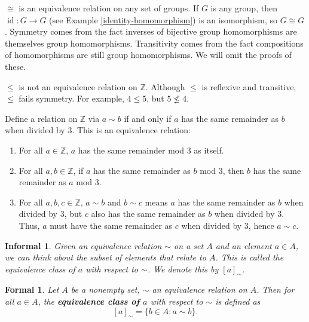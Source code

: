 \documentclass{amsart}
\DeclareMathOperator{\id}{id}
\newtheorem*{formal}{Formal}
\newtheorem*{informal}{Informal}
\begin{document}
\begin{example}\label{isomorphism}
   \(\cong\) is an equivalence relation on any set of groups. If \(G\) is any
	group, then \(\id: G\to G\) (see Example \ref{identity-homomorphism}) is an
	isomorphism, so \(G\cong G\). Symmetry comes from the fact
	inverses of bijective group homomorphisms are themselves group
	homomorphisms. Transitivity comes from the fact compositions of
	homomorphisms are still group homomorphisms. We will omit the proofs of
	these.
\end{example}

\begin{example}
   \(\le\) is not an equivalence relation on \(\mathbb{Z}\). Although \(\le\)
	is reflexive and transitive, \(\le\) fails symmetry. For example, \(4\le
	5\), but \(5\not\le 4\).
\end{example}

\begin{example}\label{mod3rel}
  Define a relation on \(\mathbb{Z}\) via \(a\sim b\) if and only if \(a\) has
  the same remainder as \(b\) when divided by \(3\). This is an equivalence
  relation:
  \begin{enumerate}[label=(\roman*)]
	  \item For all \(a\in\mathbb{Z}\), \(a\) has the same remainder mod 3 as
	  itself.
	  \item For all \(a, b\in\mathbb{Z}\), if \(a\) has the same remainder as
	  \(b\) mod \(3\), then \(b\) has the same remainder as \(a\) mod \(3\).
	  \item For all \(a, b, c\in\mathbb{Z}\), \(a\sim b\) and \(b\sim c\)
	  means \(a\) has the same remainder as \(b\) when divided by \(3\), but
	  \(c\) also has the same remainder as \(b\) when divided by \(3\). Thus,
		\(a\) must have the same remainder as \(c\) when divided by \(3\), hence
	  \(a\sim c\).
  \end{enumerate}
\end{example}

\begin{definition}[{\cite[p.~3]{df}}]
   \begin{informal}
		Given an equivalence relation \(\sim\) on a set \(A\) and an element
		\(a\in A\),
		we can think about the subset of elements that relate to \(A\). This is
		called the \emph{equivalence class} of \(a\) with respect to \(\sim\). We
		denote this by \([a]_{\sim}\).
	\end{informal}
	\begin{formal}
		Let \(A\) be a nonempty set, \(\sim\) an equivalence relation on \(A\).
		Then for all \(a\in A\), the \textbf{equivalence class of \(a\)} with
		respect to \(\sim\) is defined as 
		\[
			[a]_\sim = \{b\in A : a\sim b\}.
		\]
	\end{formal}
\end{definition}
\end{document}

